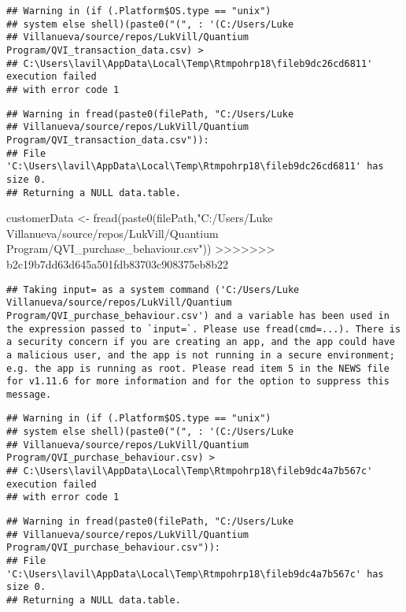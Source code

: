 \documentclass[
]{article}
\newenvironment{Shaded}{\begin{snugshade}}{\end{snugshade}}
\newcommand{\FunctionTok}[1]{\textcolor[rgb]{0.00,0.00,0.00}{#1}}
\newcommand{\NormalTok}[1]{#1}
\newcommand{\OtherTok}[1]{\textcolor[rgb]{0.56,0.35,0.01}{#1}}
\newcommand{\StringTok}[1]{\textcolor[rgb]{0.31,0.60,0.02}{#1}}
\begin{document}
\begin{verbatim}
## Warning in (if (.Platform$OS.type == "unix")
## system else shell)(paste0("(", : '(C:/Users/Luke
## Villanueva/source/repos/LukVill/Quantium Program/QVI_transaction_data.csv) >
## C:\Users\lavil\AppData\Local\Temp\Rtmpohrp18\fileb9dc26cd6811' execution failed
## with error code 1
\end{verbatim}

\begin{verbatim}
## Warning in fread(paste0(filePath, "C:/Users/Luke
## Villanueva/source/repos/LukVill/Quantium Program/QVI_transaction_data.csv")):
## File 'C:\Users\lavil\AppData\Local\Temp\Rtmpohrp18\fileb9dc26cd6811' has size 0.
## Returning a NULL data.table.
\end{verbatim}

\begin{Shaded}
\begin{Highlighting}[]
\NormalTok{customerData }\OtherTok{\textless{}{-}} \FunctionTok{fread}\NormalTok{(}\FunctionTok{paste0}\NormalTok{(filePath,}\StringTok{"C:/Users/Luke Villanueva/source/repos/LukVill/Quantium Program/QVI\_purchase\_behaviour.csv"}\NormalTok{))}
>>>>>>> b2c19b7dd63d645a501fdb83703c908375eb8b22
\end{Highlighting}
\end{Shaded}

\begin{verbatim}
## Taking input= as a system command ('C:/Users/Luke Villanueva/source/repos/LukVill/Quantium Program/QVI_purchase_behaviour.csv') and a variable has been used in the expression passed to `input=`. Please use fread(cmd=...). There is a security concern if you are creating an app, and the app could have a malicious user, and the app is not running in a secure environment; e.g. the app is running as root. Please read item 5 in the NEWS file for v1.11.6 for more information and for the option to suppress this message.
\end{verbatim}

\begin{verbatim}
## Warning in (if (.Platform$OS.type == "unix")
## system else shell)(paste0("(", : '(C:/Users/Luke
## Villanueva/source/repos/LukVill/Quantium Program/QVI_purchase_behaviour.csv) >
## C:\Users\lavil\AppData\Local\Temp\Rtmpohrp18\fileb9dc4a7b567c' execution failed
## with error code 1
\end{verbatim}

\begin{verbatim}
## Warning in fread(paste0(filePath, "C:/Users/Luke
## Villanueva/source/repos/LukVill/Quantium Program/QVI_purchase_behaviour.csv")):
## File 'C:\Users\lavil\AppData\Local\Temp\Rtmpohrp18\fileb9dc4a7b567c' has size 0.
## Returning a NULL data.table.
\end{verbatim}
\end{document}
